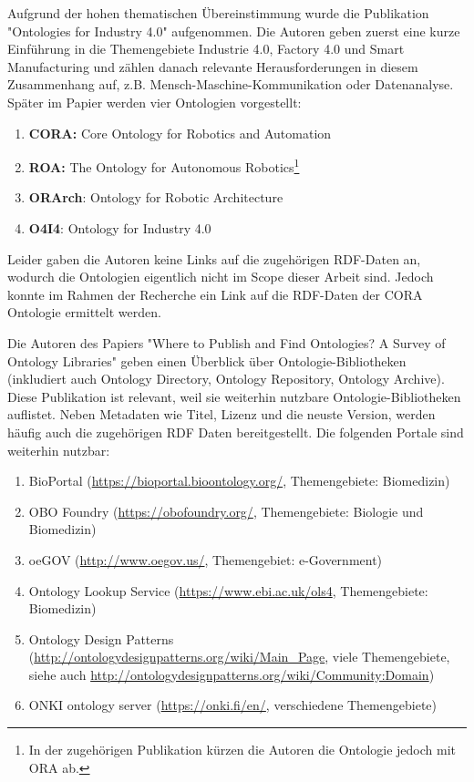 \documentclass{article}
\begin{document}
Aufgrund der hohen thematischen Übereinstimmung wurde die Publikation "Ontologies for Industry 4.0" \cite{kumar2019ontologies} aufgenommen.
Die Autoren geben zuerst eine kurze Einführung in die Themengebiete Industrie 4.0, Factory 4.0 und Smart Manufacturing und zählen danach relevante Herausforderungen in diesem Zusammenhang auf, z.B. Mensch-Maschine-Kommunikation oder Datenanalyse.
Später im Papier werden vier Ontologien vorgestellt:
\begin{enumerate}
    \item \textbf{CORA:} Core Ontology for Robotics and Automation
    \item \textbf{ROA:} The Ontology for Autonomous Robotics\footnote{In der zugehörigen Publikation\cite{olszewska2017ontology} kürzen die Autoren die Ontologie jedoch mit ORA ab.}
    \item \textbf{ORArch}: Ontology for Robotic Architecture
    \item \textbf{O4I4}: Ontology for Industry 4.0
\end{enumerate}

Leider gaben die Autoren keine Links auf die zugehörigen RDF-Daten an, wodurch die Ontologien eigentlich nicht im Scope dieser Arbeit sind.
Jedoch konnte im Rahmen der Recherche ein Link auf die RDF-Daten der CORA Ontologie ermittelt werden.

Die Autoren des Papiers "Where to Publish and Find Ontologies? A Survey of Ontology Libraries" \cite{d2012publish} geben einen Überblick über Ontologie-Bibliotheken (inkludiert auch Ontology Directory, Ontology Repository, Ontology Archive).
Diese Publikation ist relevant, weil sie weiterhin nutzbare Ontologie-Bibliotheken auflistet.
Neben Metadaten wie Titel, Lizenz und die neuste Version, werden häufig auch die zugehörigen RDF Daten bereitgestellt.
Die folgenden Portale sind weiterhin nutzbar:

\begin{enumerate}
    \item BioPortal (\url{https://bioportal.bioontology.org/}, Themengebiete: Biomedizin)
    \item OBO Foundry (\url{https://obofoundry.org/}, Themengebiete: Biologie und Biomedizin)
    \item oeGOV (\url{http://www.oegov.us/}, Themengebiet: e-Government)
    \item Ontology Lookup Service (\url{https://www.ebi.ac.uk/ols4}, Themengebiete: Biomedizin)
    \item Ontology Design Patterns (\url{http://ontologydesignpatterns.org/wiki/Main\_Page}, viele Themengebiete, siehe auch \url{http://ontologydesignpatterns.org/wiki/Community:Domain})
    \item ONKI ontology server (\url{https://onki.fi/en/}, verschiedene Themengebiete)
\end{enumerate}
\end{document}
